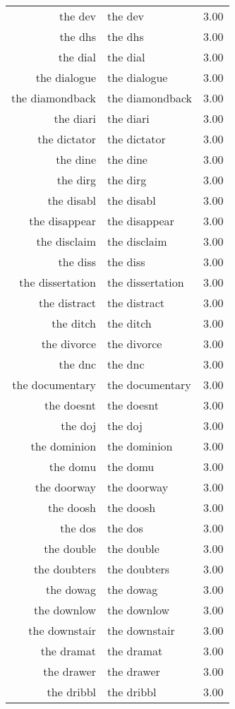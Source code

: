 \begin{table}[ht]
\begin{tabular}{rlr}
  the dev & the dev & 3.00 \\ 
  the dhs & the dhs & 3.00 \\ 
  the dial & the dial & 3.00 \\ 
  the dialogue & the dialogue & 3.00 \\ 
  the diamondback & the diamondback & 3.00 \\ 
  the diari & the diari & 3.00 \\ 
  the dictator & the dictator & 3.00 \\ 
  the dine & the dine & 3.00 \\ 
  the dirg & the dirg & 3.00 \\ 
  the disabl & the disabl & 3.00 \\ 
  the disappear & the disappear & 3.00 \\ 
  the disclaim & the disclaim & 3.00 \\ 
  the diss & the diss & 3.00 \\ 
  the dissertation & the dissertation & 3.00 \\ 
  the distract & the distract & 3.00 \\ 
  the ditch & the ditch & 3.00 \\ 
  the divorce & the divorce & 3.00 \\ 
  the dnc & the dnc & 3.00 \\ 
  the documentary & the documentary & 3.00 \\ 
  the doesnt & the doesnt & 3.00 \\ 
  the doj & the doj & 3.00 \\ 
  the dominion & the dominion & 3.00 \\ 
  the domu & the domu & 3.00 \\ 
  the doorway & the doorway & 3.00 \\ 
  the doosh & the doosh & 3.00 \\ 
  the dos & the dos & 3.00 \\ 
  the double & the double & 3.00 \\ 
  the doubters & the doubters & 3.00 \\ 
  the dowag & the dowag & 3.00 \\ 
  the downlow & the downlow & 3.00 \\ 
  the downstair & the downstair & 3.00 \\ 
  the dramat & the dramat & 3.00 \\ 
  the drawer & the drawer & 3.00 \\ 
  the dribbl & the dribbl & 3.00 \\ 

\end{tabular}
\end{table}
